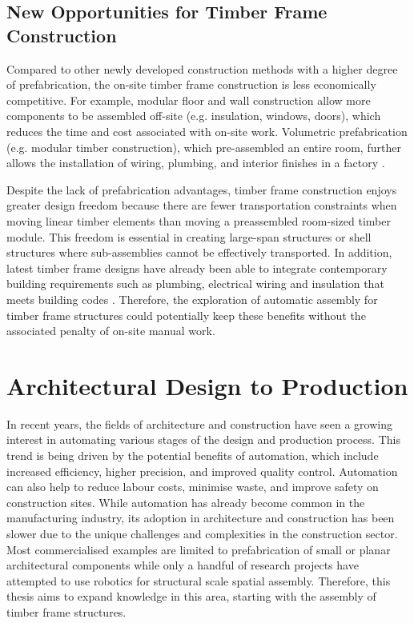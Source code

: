 \subsection{New Opportunities for Timber Frame Construction}
\label{subsection:introduction-new-opportunities-for-timber-frame-construction}

Compared to other newly developed construction methods with a higher degree of prefabrication, the on-site timber frame construction is less economically competitive. For example, modular floor and wall construction allow more components to be assembled off-site (e.g. insulation, windows, doors), which reduces the time and cost associated with on-site work. Volumetric prefabrication (e.g. modular timber construction), which pre-assembled an entire room, further allows the installation of wiring, plumbing, and interior finishes in a factory \parencite{adelDesignRoboticallyFabricated2018}. 

Despite the lack of prefabrication advantages, timber frame construction enjoys greater design freedom because there are fewer transportation constraints when moving linear timber elements than moving a preassembled room-sized timber module. This freedom is essential in creating large-span structures or shell structures where sub-assemblies cannot be effectively transported. In addition, latest timber frame designs have already been able to integrate contemporary building requirements such as plumbing, electrical wiring and insulation that meets building codes \parencite{bensonTimberframeHomeDesign1988}. Therefore, the exploration of automatic assembly for timber frame structures could potentially keep these benefits without the associated penalty of on-site manual work.

\section{Architectural Design to Production}
\label{section:introduction-architectural-design-to-production}

In recent years, the fields of architecture and construction have seen a growing interest in automating various stages of the design and production process. This trend is being driven by the potential benefits of automation, which include increased efficiency, higher precision, and improved quality control. Automation can also help to reduce labour costs, minimise waste, and improve safety on construction sites. While automation has already become common in the manufacturing industry, its adoption in architecture and construction has been slower due to the unique challenges and complexities in the construction sector. Most commercialised examples are limited to prefabrication of small or planar architectural components while only a handful of research projects have attempted to use robotics for structural scale spatial assembly. Therefore, this thesis aims to expand knowledge in this area, starting with the assembly of timber frame structures.

